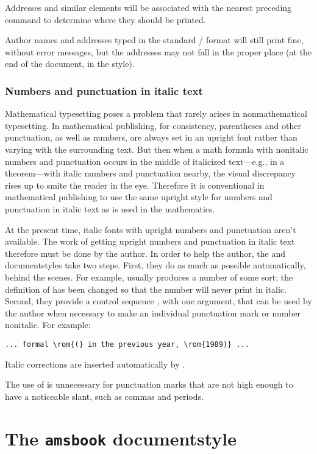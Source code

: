 Addresses and similar elements will be associated with the nearest
preceding  command to determine where they should be
printed.

Author names and addresses typed in the standard \latex/ format
will still print fine, without error messages, but the addresses
may not fall in the proper place (at the end of the document, in
the  style).

\subsubsection{Numbers and punctuation in italic text}
\label{s:rom}

Mathematical typesetting poses a problem that rarely arises in
nonmathematical typesetting.  In mathematical publishing,
for consistency,  parentheses and other punctuation, as
well as numbers, are always set in  an upright font rather than
varying with the surrounding text.   But then when a math formula with
non\-italic numbers and punctuation occurs in the middle of italicized
text---e.g., in a theorem---with italic numbers and punctuation
nearby, the visual discrepancy rises up to smite the reader
in the eye.
Therefore it is conventional in mathematical publishing to use the
same upright style for numbers and punctuation in italic text as is
used in the mathematics. 

At the present time, italic fonts with upright numbers and
punctuation aren't available.
The work of getting upright numbers and punctuation in italic text
therefore must be done by the author.   In order to
help the author, the  and  documentstyles
take two steps.  First, they do as much as possible automatically,
behind the scenes.  For example,  usually produces a number
of some sort; the definition of  has been changed so
that the number will never print in italic.  Second, they provide
a control sequence , with one argument, that can be used by the author
when necessary to make an individual punctuation mark or number
nonitalic.  For example:
\begin{verbatim}
... formal \rom{(} in the previous year, \rom{1989)} ...
\end{verbatim}
Italic corrections are inserted automatically by .

The use of  is unnecessary for punctuation marks that are not
high enough to have a noticeable slant, such as commas and periods.

\section{The {\tt amsbook} documentstyle}

